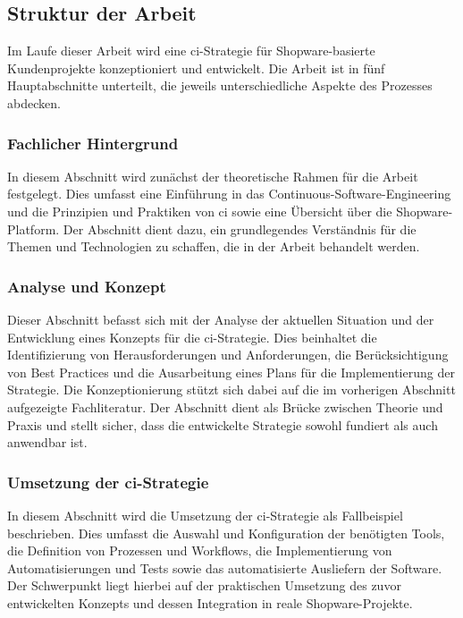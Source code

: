 \subsection{Struktur der Arbeit} \label{subsec:01-introduction-3}

Im Laufe dieser Arbeit wird eine \acrshort{ci}-Strategie für Shopware-basierte Kundenprojekte konzeptioniert und
entwickelt.
Die Arbeit ist in fünf Hauptabschnitte unterteilt, die jeweils unterschiedliche Aspekte des Prozesses abdecken.

\subsubsection{Fachlicher Hintergrund}

In diesem Abschnitt wird zunächst der theoretische Rahmen für die Arbeit festgelegt.
Dies umfasst eine Einführung in das Continuous-Software-Engineering und die Prinzipien und Praktiken von
\acrlong{ci} sowie eine Übersicht über die Shopware-Platform.
Der Abschnitt dient dazu, ein grundlegendes Verständnis für die Themen und Technologien zu schaffen, die in
der Arbeit behandelt werden.

\subsubsection{Analyse und Konzept}

Dieser Abschnitt befasst sich mit der Analyse der aktuellen Situation und der Entwicklung eines Konzepts für die
\acrshort{ci}-Strategie.
Dies beinhaltet die Identifizierung von Herausforderungen und Anforderungen, die Berücksichtigung von Best
Practices und die Ausarbeitung eines Plans für die Implementierung der Strategie.
Die Konzeptionierung stützt sich dabei auf die im vorherigen Abschnitt aufgezeigte Fachliteratur.
Der Abschnitt dient als Brücke zwischen Theorie und Praxis und stellt sicher, dass die entwickelte Strategie sowohl
fundiert als auch anwendbar ist.

\subsubsection{Umsetzung der \acrshort{ci}-Strategie}

In diesem Abschnitt wird die Umsetzung der \acrshort{ci}-Strategie als Fallbeispiel beschrieben.
Dies umfasst die Auswahl und Konfiguration der benötigten Tools, die Definition von Prozessen und Workflows,
die Implementierung von Automatisierungen und Tests sowie das automatisierte Ausliefern der Software.
Der Schwerpunkt liegt hierbei auf der praktischen Umsetzung des zuvor entwickelten Konzepts und dessen Integration in
reale Shopware-Projekte.

